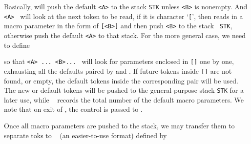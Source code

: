 {\setraw
  \long{}
  \long\def\get@para\left@#1\right@{%
    \def\check@{%
    \ifx[\next@
    \def\full@####1{\get@nepara[#1]####1}%
    \else
    \def\full@{\get@nepara[#1][#1]}\fi
    \full@}%
  \futurelet\next@\check@}
\unsetraw



Basically, {\tt\string\get@onepara[<A>][<B>]} will push the
default {\tt <A>} to the stack {\tt STK} unless {\tt <B>} is
nonempty. And {\tt\string \get@para\string \left@<A>\string
\right@} will look at the next token to be read, if it is
character \lq{\tt[}\rq, then reads in a macro parameter in the
form of {\tt [<B>]} and then push {\tt <B>} to the stack {\tt
STK}, otherwise push the default {\tt <A>} to that stack. For the
more general case, we need to define


\setraw
  \long{}
  \def\ag@in{\ifx\p@r@data\empty
    \def\next@{\relax\getp@r@s\run@CMD}%
    \else\def\next@{\expandafter\do@nepara
         \p@r@data\p@r@end}%
    \fi\next@}
  \def\run@CMD{\csname STK\the\STKcount
    \string~\endcsname}
  \newcount\p@r@count
  \long\def\st@ckparas#1\p@r@end{%
    \global\p@r@count=0%
    \gdef\p@r@data{#1}\ag@in}
\unsetraw


so that {\tt\string\st@ckparas \string\left@<A>\string\right@
... \string\left@<B>\string\right@ ...
\string\p@r@end} will look for parameters enclosed in {\tt []}
one by one, exhausting all the defaults paired by
{\tt\string\left@} and {\tt \string\right@}. If future tokens
inside {\tt []} are not found, or empty, the default tokens
inside the corresponding pair {\tt\string\left@ \string\right@}
will be used. The new or default tokens will be pushed to the
general-purpose stack {\tt STK} for a later use, while {\tt
\string\p@r@count} records the total number of the default macro
parameters. We note that on exit of {\tt \string\st@ckparas}, the
control is passed to {\tt\string\runCMD}.

\medskip
Once all macro parameters are pushed to the stack, we may
transfer them to separate toks {\tt \string\p@r@one} to {\tt
\string\p@r@nine} (an easier-to-use format) defined by

\setraw
  \newtoks\p@r@one\newtoks\p@r@two
  \newtoks\p@r@three\newtoks\p@r@four
  \newtoks\p@r@five \newtoks\p@r@six
  \newtoks\p@r@seven\newtoks\p@r@eight
  \newtoks\p@r@nine
  \def\clrp@r@s{\global\p@r@one={}%
   \global\p@r@two={}\global\p@r@three={}%
   \global\p@r@four={}\global\p@r@five={}%
   \global\p@r@six={}\global\p@r@seven={}%
   \global\p@r@eight={}\global\p@r@nine={}}
\unsetraw

}
